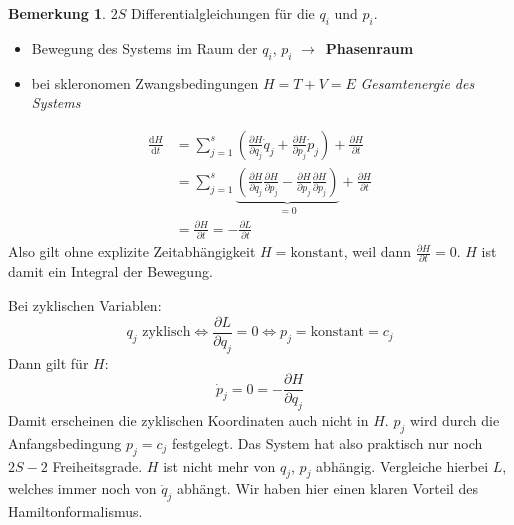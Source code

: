 \documentclass[oneside]{book}
\theoremstyle{definition}
\newtheorem*{bemerkung*}{Bemerkung}
\newcommand{\conseq}{$\rightarrow$~}
\renewcommand{\d}{\mathrm d}
\newcommand{\ddd}[2]{\frac{\d #1}{\d #2}}
\newcommand{\ffpartial}[2]{\frac{\partial #1}{\partial #2}}
\newcommand{\const}{\text{konstant}}
\begin{document}
\begin{bemerkung*}
	$2S$ Differentialgleichungen für die $q_i$ und $p_i$.
	\begin{itemize}
		\item Bewegung des Systems im Raum der $q_i$, $p_i$ \conseq \textbf{Phasenraum}
		\item bei skleronomen Zwangsbedingungen $H = T + V = E$ \textit{Gesamtenergie des Systems}
	\end{itemize}
\end{bemerkung*}
\begin{align*}
	\ddd{H}{t} &= \sum_{j=1}^{s} (\ffpartial{H}{q_j} \dot{q}_j + \ffpartial{H}{p_j} \dot{p}_j) + \ffpartial{H}{t}\\
	&= \sum_{j=1}^{s} \underbrace{(\ffpartial{H}{q_j} \ffpartial{H}{p_j} - \ffpartial{H}{p_j} \ffpartial{H}{p_j})}_{=0}+ \ffpartial{H}{t}\\
	&= \ffpartial{H}{t} = - \ffpartial{L}{t}
\end{align*} 
Also gilt ohne explizite Zeitabhängigkeit $H = \const$, weil dann $\ffpartial{H}{t} = 0$. $H$ ist damit ein Integral der Bewegung.

Bei zyklischen Variablen:
$$q_j \text{~zyklisch} \Leftrightarrow \ffpartial{L}{q_j} = 0 \Leftrightarrow p_j = \const = c_j$$
Dann gilt für $H$:
$$\dot{p}_j = 0 = -\ffpartial{H}{q_j}$$
Damit erscheinen die zyklischen Koordinaten auch nicht in $H$.
$p_j$ wird durch die Anfangsbedingung $p_j = c_j$ festgelegt. Das System hat also praktisch nur noch $2S - 2$ Freiheitsgrade.
$H$ ist nicht mehr von $q_j$, $p_j$ abhängig. Vergleiche hierbei $L$, welches immer noch von $\dot{q}_j$ abhängt. Wir haben hier einen klaren Vorteil des Hamiltonformalismus.
\end{document}
